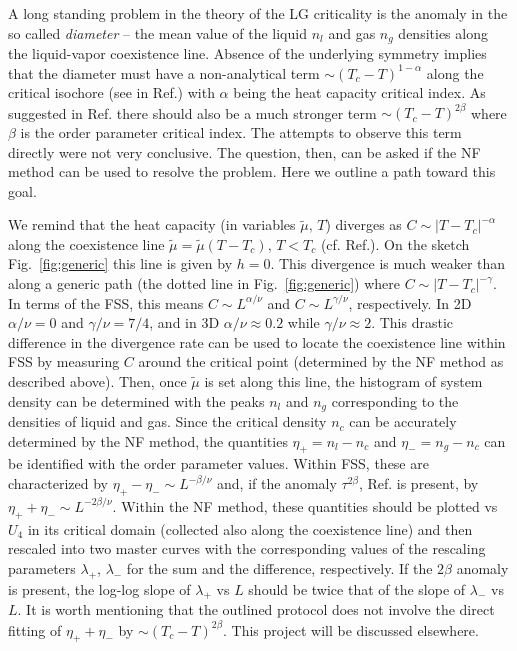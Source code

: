 \documentclass[prb,aps,twocolumn,groupedaddress,floats,showpacs,final]{revtex4}
\begin{document}
A long standing problem in the theory of the LG criticality is the anomaly in the so called {\it diameter} -- the mean value of the liquid $n_l$ and gas $n_g$ densities along the liquid-vapor coexistence line. Absence of the underlying symmetry implies that the diameter must have a non-analytical term $\sim (T_c -T)^{1-\alpha}$ along the critical isochore (see in Ref.\cite{Landau}) with $\alpha$ being the heat capacity critical index. 
As suggested in Ref.\cite{Fisher2000} there should also be a much stronger term $ \sim (T_c -T)^{2\beta}$ where $\beta$ is the order parameter critical index. The attempts to observe this term directly \cite{Fisher_2001,Fisher_2003,Fisher_2003_2} were not very conclusive. The question, then, can be asked if the NF method can be used to resolve  the problem. Here we outline a path toward this goal.

We remind that the  heat capacity (in variables $\tilde{\mu},\, T$) diverges as $C \sim |T-T_c|^{-\alpha}$ along the coexistence line $\tilde{\mu}= \tilde{\mu}(T-T_c),\, T<T_c$  (cf. Ref.\cite{Landau}). On the sketch Fig.~\ref{fig:generic} this line is given by $h=0$. This divergence is much weaker than along a generic path (the dotted line in Fig.~\ref{fig:generic}) where $C \sim |T-T_c|^{-\gamma}$. In terms of the FSS, this means $C\sim L^{\alpha/\nu}$ and $C\sim L^{\gamma/\nu}$, respectively.  In 2D $\alpha/\nu =0$ and $\gamma/\nu=7/4$, and in 3D $\alpha/\nu \approx 0.2$ while $\gamma/\nu \approx 2$. This drastic difference in the divergence rate can be used to locate the coexistence line within FSS by measuring $C$ around the critical point (determined by the NF method as described above). Then, once $\tilde{\mu}$ is set along this line, the histogram of system density can be determined with the peaks $n_l$ and $n_g$ corresponding to the densities of liquid and gas. Since the critical density $n_c$ can be accurately determined by the NF method, the quantities $\eta_+ = n_l - n_c$ and $\eta_-= n_g - n_c$ can be identified with the order parameter values. Within FSS, these are characterized by $\eta_+ - \eta_- \sim L^{-\beta/\nu}$ and, if the anomaly $\tau^{2\beta}$, Ref.\cite{Fisher2000} is present, by $\eta_+ + \eta_- \sim L^{-2\beta/\nu}$. Within the NF method, these quantities should be plotted vs $U_4$ in its critical domain (collected also along the coexistence line) and then rescaled into two master curves with the corresponding values of the rescaling parameters $\lambda_+$, $\lambda_-$ for the sum and the difference, respectively. If the $2\beta$ anomaly is present, the log-log slope of $\lambda_+$ vs $L$ should be twice that of the slope of $\lambda_-$ vs $L$. It is worth mentioning that the outlined protocol does not involve the direct fitting of $\eta_+ + \eta_-$ by $\sim (T_c -T)^{2\beta}$. This project will be discussed elsewhere.
\end{document}
